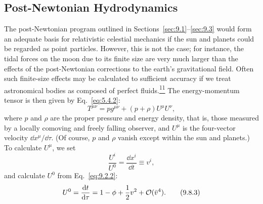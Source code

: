 %

\subsection{Post-Newtonian Hydrodynamics\optionalreading}\label{sec:9.8}

The post-Newtonian program outlined in Sections~\ref{sec:9.1}--\ref{sec:9.3}
would form an adequate basis for relativistic celestial mechanics if the
sun and planets could be regarded as point particles. However, this is not
the case; for instance, the tidal forces on the moon due to its finite size
are very much larger than the effects of the post-Newtonian corrections to
the earth's gravitational field. Often such finite-size effects may be
calculated to sufficient accuracy if we treat astronomical bodies as
composed of perfect fluids.\hyperref[ch9-ref-11]{\textsuperscript{11}} The
energy-momentum tensor is then given by Eq.~\eqref{eq:5.4.2}:
\begin{equation}
  T^{\mu\nu}
  =
  p g^{\mu\nu}+(p+\rho)U^\mu U^\nu,
  \tag{9.8.1}\label{eq:9.8.1}
\end{equation}
where \(p\) and \(\rho\) are the proper pressure and energy density, that
is, those measured by a locally comoving and freely falling observer, and
\(U^\mu\) is the four-vector velocity \(\dd x^\mu/\dd\tau\). (Of course,
\(p\) and \(\rho\) vanish except within the sun and planets.) To calculate
\(U^\mu\), we set
\begin{equation}
  \frac{U^i}{U^0}
  =
  \frac{\dd x^i}{\dd t}
  \equiv v^i,
  \tag{9.8.2}\label{eq:9.8.2}
\end{equation}
and calculate \(U^0\) from Eq.~\eqref{eq:9.2.2}:
\begin{equation}
  U^0
  =
  \frac{\mathop{}\!\mathrm{d} t}{\mathop{}\!\mathrm{d}\tau}
  =
  1-\phi+\frac12v^2+\mathcal{O}(\bar v^4).
  \tag{9.8.3}\label{eq:9.8.3}
\end{equation}


